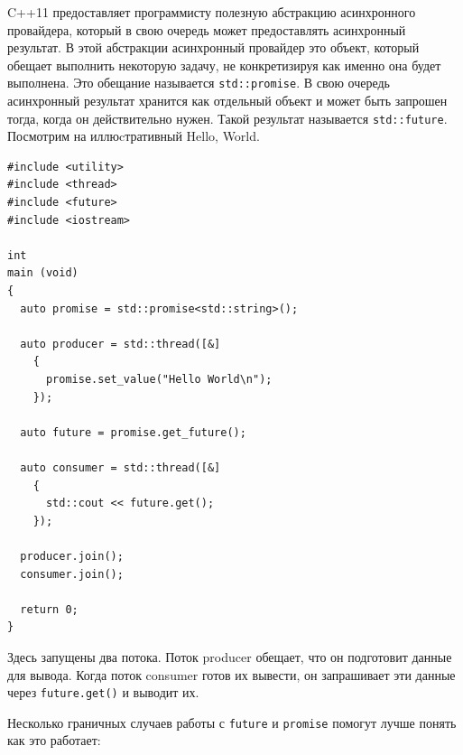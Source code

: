 \documentclass[a4paper,12pt,oneside]{article}
\begin{document}
C++11 предоставляет программисту полезную абстракцию асинхронного провайдера, который в свою очередь может предоставлять асинхронный результат. В этой абстракции асинхронный провайдер это объект, который обещает выполнить некоторую задачу, не конкретизируя как именно она будет выполнена. Это обещание называется \lstinline!std::promise!. В свою очередь асинхронный результат хранится как отдельный объект и может быть запрошен тогда, когда он действительно нужен. Такой результат называется \lstinline!std::future!. Посмотрим на иллюcтративный Hello, World.

\begin{lstlisting}
#include <utility>
#include <thread>
#include <future>
#include <iostream>

int
main (void)
{
  auto promise = std::promise<std::string>();

  auto producer = std::thread([&]
    {
      promise.set_value("Hello World\n");
    });

  auto future = promise.get_future();

  auto consumer = std::thread([&]
    {
      std::cout << future.get();
    });

  producer.join();
  consumer.join();

  return 0;
}
\end{lstlisting}

Здесь запущены два потока. Поток producer обещает, что он подготовит данные для вывода. Когда поток consumer готов их вывести, он запрашивает эти данные через \lstinline!future.get()! и выводит их.

Несколько граничных случаев работы с \lstinline!future! и \lstinline!promise! помогут лучше понять как это работает:
\end{document}
